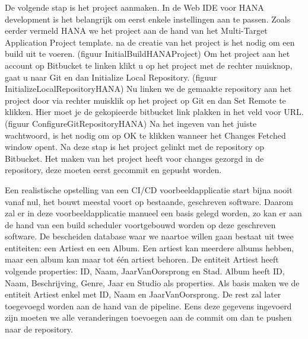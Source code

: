     De volgende stap is het project aanmaken. In de Web IDE voor HANA development is het belangrijk om eerst enkele instellingen aan te passen.
    Zoals eerder vermeld HANA we het project aan de hand van het Multi-Target Application Project template. na de creatie van het project is het nodig om een build uit te voeren. (figuur InitialBuildHANAProject)
    Om het project aan het account op Bitbucket te linken klikt u op het project met de rechter muisknop, gaat u naar Git en dan Initialize Local Repository. (figuur InitializeLocalRepositoryHANA)
    Nu linken we de gemaakte repository aan het project door via rechter muisklik op het project op Git en dan Set Remote te klikken. Hier moet je de gekopieerde bitbucket link plakken in het veld voor URL. (figuur ConfigureGitRepositoryHANA) Na het ingeven van het juiste wachtwoord, is het nodig om op OK te klikken wanneer het Changes Fetched window opent.
    Na deze stap is het project gelinkt met de repository op Bitbucket. Het maken van het project heeft voor changes gezorgd in de repository, deze moeten eerst gecommit en gepusht worden. %
    
    Een realistische opstelling van een CI/CD voorbeeldapplicatie start bijna nooit vanaf nul, het bouwt meestal voort op bestaande, geschreven software.
    Daarom zal er in deze voorbeeldapplicatie manueel een basis gelegd worden, zo kan er aan de hand van een build scheduler voortgebouwd worden op deze geschreven software.
    De bescheiden database waar we naartoe willen gaan bestaat uit twee entiteiten: een Artiest en een Album. Een artiest kan meerdere albums hebben, maar een album kan maar tot één artiest behoren. De entiteit Artiest heeft volgende properties: ID, Naam, JaarVanOorsprong en Stad. Album heeft ID, Naam, Beschrijving, Genre, Jaar en Studio als properties. Als basis maken we de entiteit Artiest enkel met ID, Naam en JaarVanOorsprong. De rest zal later toegevoegd worden aan de hand van de pipeline.
    Eens deze gegevens ingevoerd zijn moeten we alle veranderingen toevoegen aan de commit om dan te pushen naar de repository.
    
